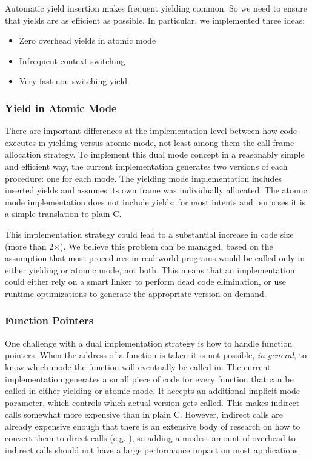 \documentclass[acmsmall,anonymous,review]{acmart}\settopmatter{printfolios=true,printccs=false,printacmref=false}
\begin{document}
Automatic yield insertion makes frequent yielding common.
So we need to ensure that yields are as efficient as possible.
In particular, we implemented three ideas:

\begin{itemize}
\item Zero overhead yields in atomic mode
\item Infrequent context switching
\item Very fast non-switching yield
\end{itemize}

\subsubsection{Yield in Atomic Mode}

There are important differences at the implementation level between how code executes in yielding versus atomic mode, not least among them the call frame allocation strategy.
To implement this dual mode concept in a reasonably simple and efficient way, the current \charcoal{} implementation generates two versions of each procedure: one for each mode.
The yielding mode implementation includes inserted yields and assumes its own frame was individually allocated.
The atomic mode implementation does not include yields; for most intents and purposes it is a simple translation to plain C.

This implementation strategy could lead to a substantial increase in code size (more than 2$\times$).
We believe this problem can be managed, based on the assumption that most procedures in real-world programs would be called only in either yielding or atomic mode, not both.
This means that an implementation could either rely on a smart linker to perform dead code elimination, or use runtime optimizations to generate the appropriate version on-demand.


\subsubsection{Function Pointers}

One challenge with a dual implementation strategy is how to handle function pointers.
When the address of a function is taken it is not possible, \emph{in general}, to know which mode the function will eventually be called in.
The current implementation generates a small piece of code for every function that can be called in either yielding or atomic mode.
It accepts an additional implicit mode parameter, which controls which actual version gets called.
This makes indirect calls somewhat more expensive than in plain C.
However, indirect calls are already expensive enough that there is an extensive body of research on how to convert them to direct calls (e.g. \cite{Dean1995}), so adding a modest amount of overhead to indirect calls should not have a large performance impact on most applications.
\end{document}
